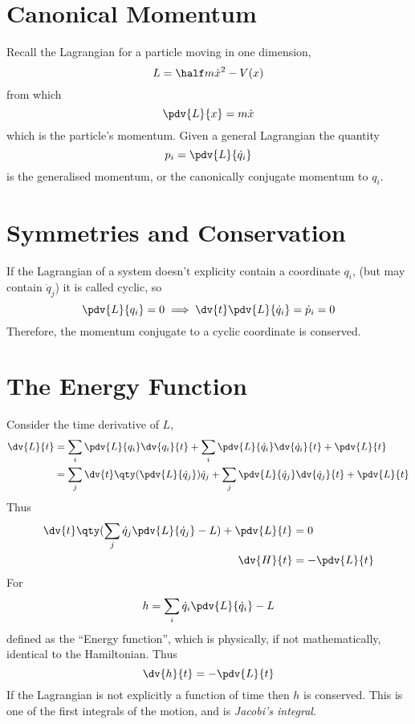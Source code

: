 \section{Canonical Momentum}
\label{sec:canonical-momentum}

Recall the Lagrangian for a particle moving in one dimension,
\[ L = \half m \dot{x}^2 - V(x) \]
from which
\[ \pdv{L}{x} = m \dot{x} \] which is the particle's momentum. Given a
general Lagrangian the quantity
\begin{equation}
  \label{eq:32}
  p_i = \pdv{L}{\dot{q}_i}
\end{equation}
is the generalised momentum, or the canonically conjugate momentum to
$q_i$.

\section{Symmetries and Conservation}
\label{sec:symm-cons-theor}

If the Lagrangian of a system doesn't explicity contain a coordinate
$q_i$, (but may contain $\dot{q}_j$) it is called cyclic, so
\begin{equation}
  \label{eq:33}
  \pdv{L}{q_i} = 0 \implies \dv{t}\pdv{L}{\dot{q}_i} = \dot{p}_i = 0
\end{equation}
Therefore, the momentum conjugate to a cyclic coordinate is conserved.

\section{The Energy Function}
\label{sec:energy-function}

Consider the time derivative of $L$,
\begin{align*}
  \label{eq:34}
  \dv{L}{t} &= \sum_i \pdv{L}{q_i} \dv{q_i}{t} + \sum_i \pdv{L}{\dot{q}_i} \dv{\dot{q}_i}{t} + \pdv{L}{t} \\
&= \sum_j \dv{t} \qty(\pdv{L}{\dot{q}_j}) \dot{q}_j + \sum_j \pdv{L}{\dot{q}_j} \dv{\dot{q}_j}{t} +\pdv{L}{t}
\end{align*}
Thus
\begin{align*}
\dv{t} \qty( \sum_j \dot{q}_j \pdv{L}{\dot{q}_j} - L ) + \pdv{L}{t} &= 0 \\
\dv{H}{t} &= - \pdv{L}{t}
\end{align*}
For 
\begin{equation}
  \label{eq:35}
  h = \sum_i \dot{q}_i \pdv{L}{\dot{q}_i} - L
\end{equation}
defined as the ``Energy function'', which is physically, if not mathematically, identical to the Hamiltonian.
Thus
\begin{equation}
  \label{eq:92}
  \dv{h}{t} = - \pdv{L}{t}
\end{equation}
If the Lagrangian is not explicitly a function of time then $h$ is
conserved. This is one of the first integrals of the motion, and is 
\emph{Jacobi's integral}.

